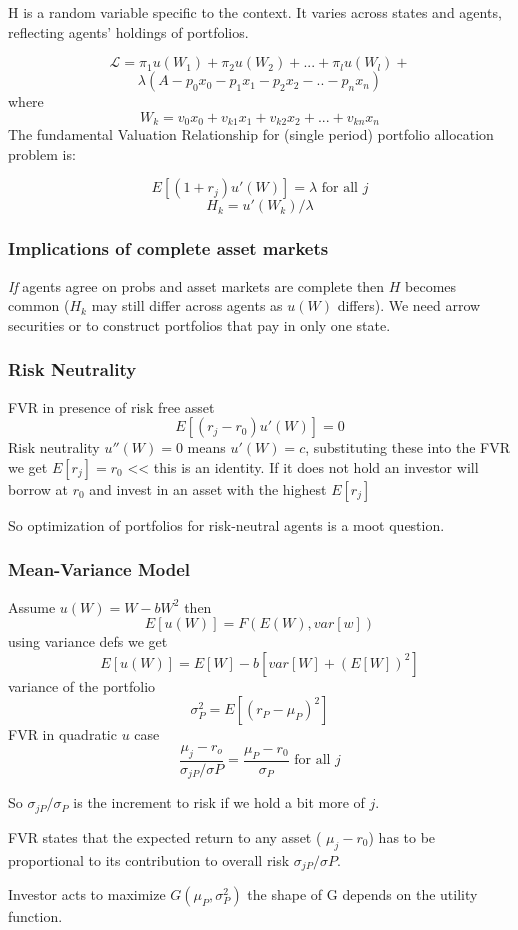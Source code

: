 \documentclass[a4paper,12pt]{article}
\begin{document}
\begin{multicols}{2}
H is a random variable specific to the context. It varies across states and
agents, reflecting agents' holdings of portfolios.


\[\mathcal{L}=\pi_1u(W_1)+\pi_2u(W_2)+...+\pi_lu(W_l)+\]
\[\lambda(A-p_0x_0-p_1x_1-p_2x_2-..-p_nx_n)\]
where
\[W_k=v_0x_0+v_{k1}x_1+v_{k2}x_2+...+v_{kn}x_n\]
The fundamental Valuation Relationship for (single period) portfolio allocation
problem is:

\[E[(1+r_j)u'(W)]=\lambda \mbox{ for all } j\]
\[H_k=u'(W_k)/\lambda\]
\subsubsection*{Implications of complete asset markets}
\emph{If} agents agree on probs and asset markets are complete then $H$ becomes
common ($H_k$ may still differ across agents as $u(W)$ differs). We need arrow
securities or to construct portfolios that pay in only one state.

\subsubsection*{Risk Neutrality}
FVR in presence of risk free asset
\[E[(r_j-r_0)u'(W)]=0\]
Risk neutrality $u''(W)=0$ means $u'(W)=c$, substituting these into the FVR we
get $E[r_j]=r_0$ << this is an identity. If it does not hold an investor will
borrow at $r_0$ and invest in an asset with the highest $E[r_j]$

So optimization of portfolios for risk-neutral agents is a moot question.

\subsubsection*{Mean-Variance Model}
Assume $u(W)=W-bW^2$ then
\[E[u(W)]=F(E(W),var[w])\]
using variance defs we get 
\[E[u(W)]=E[W]-b[var[W]+(E[W])^2]\]
variance of the portfolio
\[\sigma^2_P=E[(r_P-\mu_P)^2]\]
FVR in quadratic $u$ case
\[\frac{\mu_j-r_o}{\sigma_{jP}/\sigma{P}}=\frac{\mu_P-r_0}{\sigma_P}\mbox{ for
all } j\]

So $\sigma_{jP}/\sigma_P$ is the increment to risk if we hold a bit more of
$j$.

FVR states that the expected return to any asset ( $\mu_j - r_0$) has to be
proportional to its contribution to overall risk $\sigma_{jP}/\sigma{P}$.

Investor acts to maximize $G(\mu_P,\sigma^2_P)$ the shape of G depends on the
utility function. 


\end{multicols}
\end{document}
